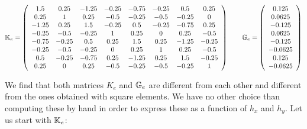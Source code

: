 \[
{\mathbb{K}}_e=
\left(
\begin{array}{cccccccc}
 1.5&  0.25& -1.25& -0.25& -0.75& -0.25&  0.5&  0.25\\
 0.25&  1&  0.25& -0.5& -0.25& -0.5& -0.25&  0\\
-1.25&  0.25&  1.5& -0.25&  0.5& -0.25& -0.75&  0.25\\
-0.25& -0.5& -0.25&  1&  0.25&  0&  0.25& -0.5\\
-0.75& -0.25&  0.5&  0.25&  1.5&  0.25& -1.25& -0.25\\
-0.25& -0.5& -0.25&  0&  0.25&  1&  0.25& -0.5\\
 0.5& -0.25& -0.75&  0.25& -1.25&  0.25&  1.5& -0.25\\
 0.25& 0&  0.25& -0.5& -0.25& -0.5& -0.25&  1
\end{array}
\right)
\qquad
{\mathbb{G}}_e = 
\left(
\begin{array}{c}
 0.125\\
 0.0625\\
-0.125\\
 0.0625\\
-0.125\\
-0.0625\\
 0.125\\
-0.0625
\end{array}
\right)
\]

We find that both matrices $K_e$ and ${\mathbb{G}}_e$ are different from each other and different from the ones obtained with square elements. We have no other choice than computing these by hand in order to express these as a function of $h_x$ and $h_y$. Let us start with ${\mathbb{K}}_e$:


